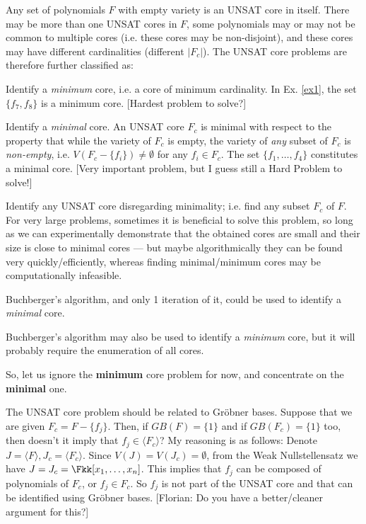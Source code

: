 Any set of polynomials $F$ with empty variety is an UNSAT core in
itself. There may be more than one UNSAT cores in $F$, some
polynomials may or may not be common to multiple cores (i.e. these
cores may be non-disjoint), and these cores may have
different cardinalities (different $|F_c|$). The UNSAT core problems
are therefore further classified as: 
\bi
\item Identify a {\it minimum} core, i.e. a core of minimum
  cardinality. In Ex. \ref{ex1}, the set $\{f_7, f_8\}$ is a minimum
  core. [Hardest problem to solve?]
\item Identify a {\it minimal} core. An UNSAT core $F_{c}$ is minimal
  with respect to the property that while the variety of $F_{c}$ is
  empty, the variety of {\it any} subset of $F_c$ is {\it non-empty},
  i.e. $V( F_{c} - \{f_i\} ) \neq \emptyset$ for any $f_i \in
  F_c$. The set $\{f_1, \dots, f_4\}$ constitutes a minimal
  core. [Very important problem, but I guess still a Hard Problem to
    solve!] 
\item Identify any UNSAT core disregarding minimality; i.e. find any
  subset $F_c$ of $F$. For very large problems, sometimes it is
  beneficial to solve this problem, so long as we can experimentally
  demonstrate that the obtained cores are small and their size is close to
  minimal cores --- but maybe algorithmically they can be found very
  quickly/efficiently, whereas finding minimal/minimum cores may be
  computationally infeasible. 
\ei


\begin{Conjecture}
Buchberger's algorithm, and only 1 iteration of it, could be used to
identify a {\it minimal} core. 
\end{Conjecture}

\begin{Conjecture}
Buchberger's algorithm may also be used to identify a {\it minimum}
core, but it will probably require the enumeration of all cores. 
\end{Conjecture}

So,
let us ignore the {\bf minimum} core problem for now, and concentrate
on the {\bf minimal} one. 

The UNSAT core problem should be related to Gr\"obner bases. Suppose
that we are given $F_c = F - \{f_j\}$. Then, if $GB(F) = \{1\}$ and if
$GB(F_c) = \{1\}$ too, then doesn't it imply that $f_j \in \langle F_c
\rangle$? My reasoning is as follows: Denote $J = \langle F \rangle,
J_c = \langle F_c \rangle$. Since $V(J) = V(J_c) = \emptyset$, from
the Weak Nullstellensatz we have $J = J_c = \Fkk[x_1, \dots,
  x_n]$. This implies that $f_j$ can be composed of polynomials of
$F_c$, or $f_j \in F_c$. So $f_j$ is not part of the UNSAT core and
that can be identified using Gr\"obner bases. [Florian: Do you have a
  better/cleaner argument for this?]


